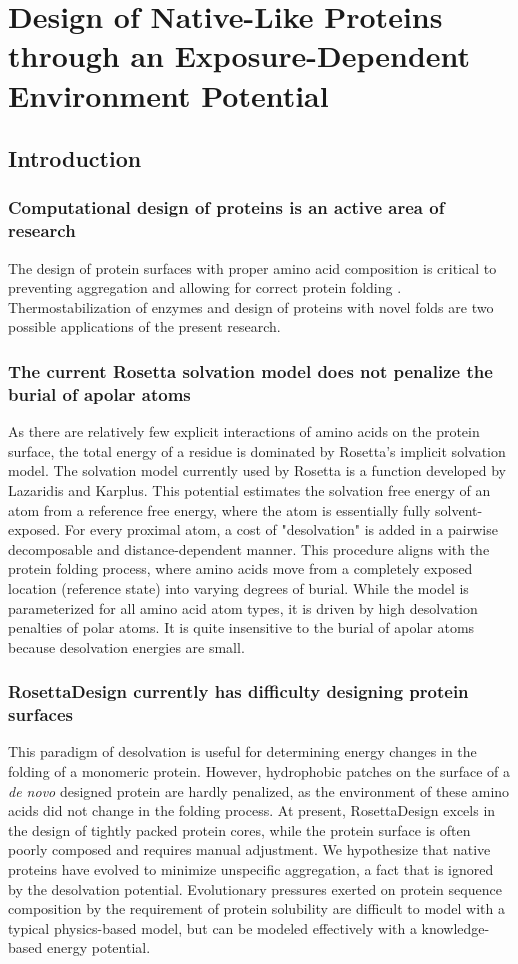 \chapter{Design of Native-Like Proteins through an Exposure-Dependent Environment Potential}
\label{chap:nv_kbp}
\section{Introduction}
\subsection{Computational design of proteins is an active area of research}
The design of protein surfaces with proper amino acid composition is critical to preventing aggregation and allowing for correct protein folding \citep{Chandler:2005ds}.
Thermostabilization of enzymes and design of proteins with novel folds are two possible applications of the present research. 

\subsection{The current Rosetta solvation model does not penalize the burial of apolar atoms}
As there are relatively few explicit interactions of amino acids on the protein surface, the total energy of a residue is dominated by Rosetta's implicit solvation model.
The solvation model currently used by Rosetta is a function developed by Lazaridis and Karplus\citep{Lazaridis:1999wi}.
This potential estimates the solvation free energy of an atom from a reference free energy, where the atom is essentially fully solvent-exposed.
For every proximal atom, a cost of "desolvation" is added in a pairwise decomposable and distance-dependent manner.
This procedure aligns with the protein folding process, where amino acids move from a completely exposed location (reference state) into varying degrees of burial.
While the model is parameterized for all amino acid atom types, it is driven by high desolvation penalties of polar atoms.
It is quite insensitive to the burial of apolar atoms because desolvation energies are small. 

\subsection{RosettaDesign currently has difficulty designing protein surfaces}
This paradigm of desolvation is useful for determining energy changes in the folding of a monomeric protein.
However, hydrophobic patches on the surface of a \textit{de novo} designed protein are hardly penalized, as the environment of these amino acids did not change in the folding process.
At present, RosettaDesign excels in the design of tightly packed protein cores, while the protein surface is often poorly composed and requires manual adjustment\citep{Dantas:2003vt}.
We hypothesize that native proteins have evolved to minimize unspecific aggregation, a fact that is ignored by the desolvation potential.
Evolutionary pressures exerted on protein sequence composition by the requirement of protein solubility are difficult to model with a typical physics-based model, but can be modeled effectively with a knowledge-based energy potential. 

